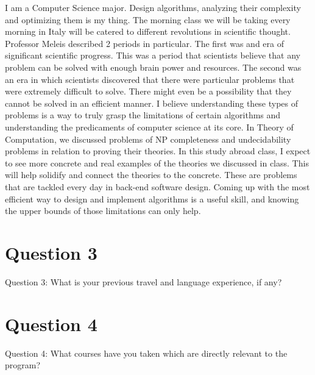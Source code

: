 \documentclass{article}
\begin{document}
I am a Computer Science major. Design algorithms, analyzing their complexity and
optimizing them is my thing. The morning class we will be taking every morning
in Italy will be catered to different revolutions in  scientific thought.
Professor Meleis described 2 periods in particular. The first was and era of
significant scientific progress. This was a period that scientists believe that
any problem can be solved with enough brain power and resources. The second was
an era in which scientists discovered that there were particular problems that
were extremely difficult to solve. There might even be a possibility that they
cannot be solved in an efficient manner. I believe understanding these types of
problems is a way to truly grasp the limitations of certain algorithms and
understanding the predicaments of computer science at its core. In Theory of
Computation, we discussed problems of NP completeness and undecidability
problems in relation to proving their theories. In this study abroad class, I
expect to see more concrete and real examples of the theories we discussed in
class. This will help solidify and connect the theories to the concrete. These
are problems that are tackled every day in back-end software design. Coming up
with the most efficient way to design and implement algorithms is a useful
skill, and knowing the upper bounds of those limitations can only help. 

\section{Question 3}
Question 3: What is your previous travel and language experience, if any?

\section{Question 4}
Question 4: What courses have you taken which are directly relevant to the
program?
\end{document}
